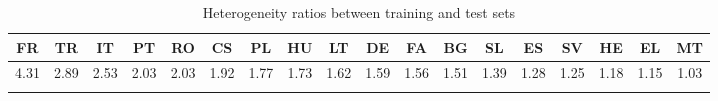 \documentclass[output=paper,modfonts,nonflat,draftmode]{langsci/langscibook}
\begin{document}
\begin{table}
\caption{\label{tbl:homogeneity}Heterogeneity ratios between training and test sets}

{\scriptsize{}}%
\setlength\tabcolsep{3.0pt} %
\renewcommand{\arraystretch}{0.65} %
\begin{tabular}{cccccccccccccccccc}
\lsptoprule 
{\scriptsize{}FR} & {\scriptsize{}TR} & {\scriptsize{}IT} & {\scriptsize{}PT} & {\scriptsize{}RO} & {\scriptsize{}CS} & {\scriptsize{}PL} & {\scriptsize{}HU} & {\scriptsize{}LT} & {\scriptsize{}DE} & {\scriptsize{}FA} & {\scriptsize{}BG} & {\scriptsize{}SL} & {\scriptsize{}ES} & {\scriptsize{}SV} & {\scriptsize{}HE} & {\scriptsize{}EL} & {\scriptsize{}MT}\tabularnewline
\midrule
{\scriptsize{}4.31} & {\scriptsize{}2.89} & {\scriptsize{}2.53} & {\scriptsize{}2.03} & {\scriptsize{}2.03} & {\scriptsize{}1.92} & {\scriptsize{}1.77} & {\scriptsize{}1.73} & {\scriptsize{}1.62} & {\scriptsize{}1.59} & {\scriptsize{}1.56} & {\scriptsize{}1.51} & {\scriptsize{}1.39} & {\scriptsize{}1.28} & {\scriptsize{}1.25} & {\scriptsize{}1.18} & {\scriptsize{}1.15} & {\scriptsize{}1.03}\tabularnewline
\lspbottomrule
\end{tabular}

\end{table}
\end{document}
